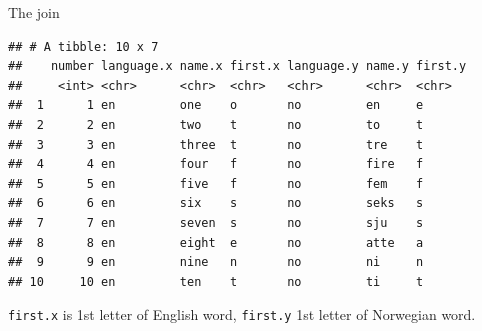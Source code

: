 \documentclass[
  ignorenonframetext,
]{beamer}
\newenvironment{Shaded}{\begin{snugshade}}{\end{snugshade}}
\newcommand{\DataTypeTok}[1]{\textcolor[rgb]{0.13,0.29,0.53}{#1}}
\newcommand{\KeywordTok}[1]{\textcolor[rgb]{0.13,0.29,0.53}{\textbf{#1}}}
\newcommand{\NormalTok}[1]{#1}
\newcommand{\OperatorTok}[1]{\textcolor[rgb]{0.81,0.36,0.00}{\textbf{#1}}}
\newcommand{\StringTok}[1]{\textcolor[rgb]{0.31,0.60,0.02}{#1}}
\begin{document}
\begin{frame}[fragile]{The join}
\protect\hypertarget{the-join}{}

\scriptsize

\begin{Shaded}
\end{Shaded}

\begin{verbatim}
## # A tibble: 10 x 7
##    number language.x name.x first.x language.y name.y first.y
##     <int> <chr>      <chr>  <chr>   <chr>      <chr>  <chr>  
##  1      1 en         one    o       no         en     e      
##  2      2 en         two    t       no         to     t      
##  3      3 en         three  t       no         tre    t      
##  4      4 en         four   f       no         fire   f      
##  5      5 en         five   f       no         fem    f      
##  6      6 en         six    s       no         seks   s      
##  7      7 en         seven  s       no         sju    s      
##  8      8 en         eight  e       no         atte   a      
##  9      9 en         nine   n       no         ni     n      
## 10     10 en         ten    t       no         ti     t
\end{verbatim}

\normalsize

\texttt{first.x} is 1st letter of English word, \texttt{first.y} 1st
letter of Norwegian word.

\end{frame}
\end{document}

